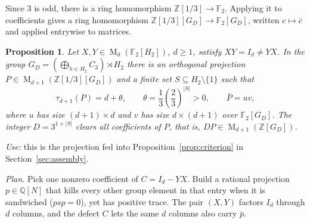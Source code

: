 \documentclass[11pt]{article}
\newtheorem{proposition}[theorem]{Proposition}
\theoremstyle{remark}
\numberwithin{equation}{section}
\newcommand{\F}{\mathbb F}
\newcommand{\Z}{\mathbb Z}
\newcommand{\Q}{\mathbb Q}
\newcommand{\Mat}{\operatorname{M}}
\begin{document}
Since $3$ is odd, there is a ring homomorphism $\Z[1/3]\to\F_2$. Applying it to coefficients gives a ring homomorphism $\Z[1/3][G_D]\to\F_2[G_D]$, written $c\mapsto\bar c$ and applied entrywise to matrices.

\begin{proposition}\label{prop:separation}
Let $X,Y\in\Mat_d(\F_2[H_2])$, $d\ge1$, satisfy
$XY=I_d\ne YX$. In the group
$G_D=(\bigoplus_{h\in H_2}C_3)\rtimes H_2$ there is an orthogonal
projection $P\in\Mat_{d+1}(\Z[1/3][G_D])$ and a finite set
$S\subseteq H_2\setminus\{1\}$ such that
\[
 \tau_{d+1}(P)=d+\theta,\qquad
 \theta=\frac13\left(\frac23\right)^{|S|}>0,
 \qquad \bar P=uv,
\]
where $u$ has size $(d+1)\times d$ and $v$ has size $d\times(d+1)$
over $\F_2[G_D]$. The integer $D=3^{1+|S|}$ clears all coefficients
of $P$, that is, $DP\in\Mat_{d+1}(\Z[G_D])$.
\end{proposition}

\emph{Use:} this is the projection fed into Proposition~\ref{prop:criterion} in Section~\ref{sec:assembly}.

\emph{Plan.} Pick one nonzero coefficient of $C=I_d-YX$. Build a rational projection $p\in\Q[N]$ that kills every other group element in that entry when it is sandwiched ($psp=0$), yet has positive trace. The pair $(X,Y)$ factors $I_d$ through $d$ columns, and the defect $C$ lets the same $d$ columns also carry $\bar p$.
\end{document}
